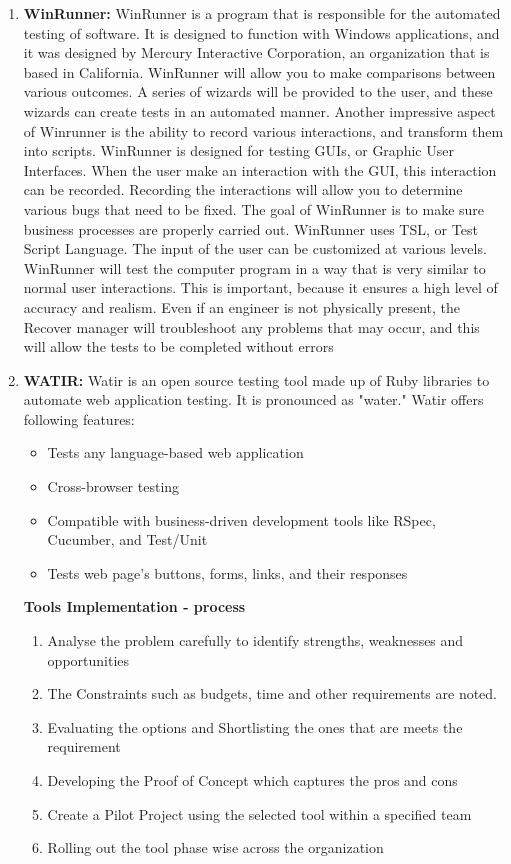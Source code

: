 \begin{enumerate}
\item \textbf{WinRunner:}
WinRunner is a program that is responsible for the automated testing of software. It is designed to function with Windows applications, and it was designed by Mercury Interactive Corporation, an organization that is based in California. WinRunner will allow you to make comparisons between various outcomes. 
A series of wizards will be provided to the user, and these wizards can create tests in an automated manner. Another impressive aspect of Winrunner is the ability to record various interactions, and transform them into scripts. WinRunner is designed for testing GUIs, or Graphic User Interfaces.
When the user make an interaction with the GUI, this interaction can be recorded. Recording the interactions will allow you to determine various bugs that need to be fixed. The goal of WinRunner is to make sure business processes are properly carried out. WinRunner uses TSL, or Test Script Language. The input of the user can be customized at various levels. WinRunner will test the computer program in a way that is very similar to normal user interactions. This is important, because it ensures a high level of accuracy and realism. Even if an engineer is not physically present, the Recover manager will troubleshoot any problems that may occur, and this will allow the tests to be completed without errors


\item \textbf{WATIR:}
Watir is an open source testing tool made up of Ruby libraries to automate web application testing. It is pronounced as "water."
Watir offers following features:
\begin{itemize}
\item Tests any language-based web application
\item Cross-browser testing
\item Compatible with business-driven development tools like RSpec, Cucumber, and Test/Unit
\item Tests web page's buttons, forms, links, and their responses
\end{itemize}

\textbf{Tools Implementation - process}
\begin{enumerate}
\item Analyse the problem carefully to identify strengths, weaknesses and opportunities 
\item The Constraints such as budgets, time and other requirements are noted.
\item Evaluating the options and Shortlisting the ones that are meets the requirement
\item Developing the Proof of Concept which captures the pros and cons
\item Create a Pilot Project using the selected tool within a specified team
\item Rolling out the tool phase wise across the organization
\end{enumerate}
\end{enumerate}
